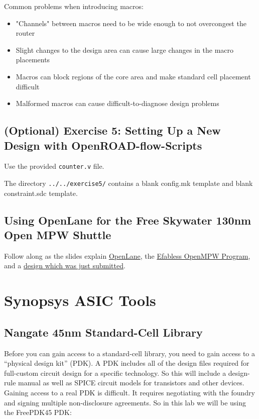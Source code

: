 \documentclass[a4paper,12pt,twoside]{article}
\begin{document}
Common problems when introducing macros:
\begin{itemize}
    \item "Channels" between macros need to be wide enough to not overcongest the router
    \item Slight changes to the design area can cause large changes in the macro placements
    \item Macros can block regions of the core area and make standard cell placement difficult
    \item Malformed macros can cause difficult-to-diagnose design problems
\end{itemize}
\subsection{(Optional) Exercise 5: Setting Up a New Design with OpenROAD-flow-Scripts}\label{SE5}
Use the provided \texttt{counter.v} file.

The directory \texttt{../../exercise5/} contains a blank config.mk template and blank constraint.sdc template.

\subsection{Using OpenLane for the Free Skywater 130nm Open MPW Shuttle}
Follow along as the slides explain \href{https://github.com/The-OpenROAD-Project/OpenLane}{OpenLane}, the \href{https://efabless.com/open_shuttle_program}{Efabless OpenMPW Program}, and a \href{https://platform.efabless.com/projects/1165}{design which was just submitted}.

\newpage
\section{Synopsys ASIC Tools}\label{STools}
\subsection{Nangate 45nm Standard-Cell Library}
Before you can gain access to a standard-cell library, you need to gain access to a “physical design kit” (PDK). A PDK includes all of the design files required for full-custom circuit design for a specific technology. So this will include a design-rule manual as well as SPICE circuit models for transistors and other devices. Gaining access to a real PDK is difficult. It requires negotiating with the foundry and signing multiple non-disclosure agreements. So in this lab we will be using the FreePDK45 PDK:
\end{document}
